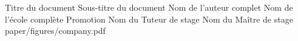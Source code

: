 \documentclass[a4paper,12pt]{report}
\begin{document}
\imtnepagedegarde
    {Titre du document} %
    {Sous-titre du document} %
    {Nom de l'auteur complet} %
    {Nom de l'école complète} %
    {Promotion} %
    {Nom du Tuteur de stage} %
    {Nom du Maître de stage} %
    {paper/figures/company.pdf} %



\tableofcontents
\clearpage










\cleardoublepage


\end{document}
